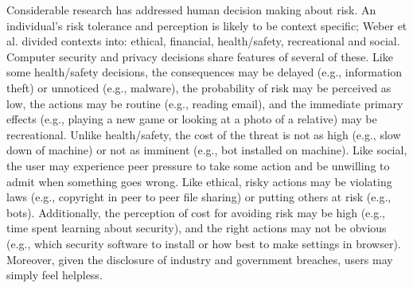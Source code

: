 Considerable research has addressed human decision making about risk. 
An individual’s risk tolerance and perception is likely to be context specific; Weber et al. \citeyear{weber2002} divided contexts into: ethical, financial, health/safety, recreational and social. 
Computer security and privacy decisions share features of several of these. 
Like some health/safety decisions, the consequences may be delayed (e.g., information theft) or unnoticed (e.g., malware), the probability of risk may be perceived as low, the actions may be routine (e.g., reading email), and the immediate primary effects (e.g., playing a new game or looking at a photo of a relative) may be recreational. 
Unlike health/safety, the cost of the threat is not as high (e.g., slow down of machine) or not as imminent (e.g., bot installed on machine). 
Like social, the user may experience peer pressure to take some action and be unwilling to admit when something goes wrong. 
Like ethical, risky actions may be violating laws (e.g., copyright in peer to peer file sharing) or putting others at risk (e.g., bots).
Additionally, the perception of cost for avoiding risk may be high (e.g., time spent learning about security), and the right actions may not be obvious (e.g., which security software to install or how best to make settings in browser). 
Moreover, given the disclosure of industry and government breaches, users may simply feel helpless.

